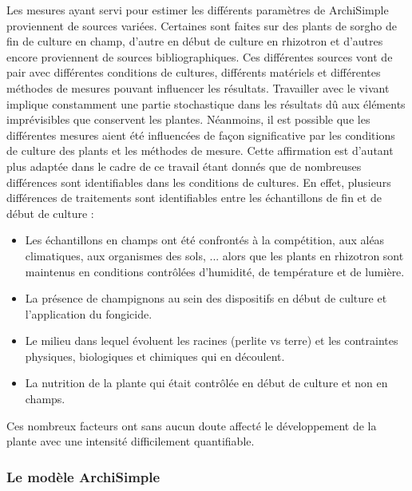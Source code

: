 Les mesures ayant servi pour estimer les différents paramètres de ArchiSimple proviennent de sources variées.
Certaines sont faites sur des plants de sorgho de fin de culture en champ, d'autre en début de culture en rhizotron et d'autres encore proviennent de sources bibliographiques.
Ces différentes sources vont de pair avec différentes conditions de cultures, différents matériels et différentes méthodes de mesures pouvant influencer les résultats. 
Travailler avec le vivant implique constamment une partie stochastique dans les résultats dû aux éléments imprévisibles que conservent les plantes.
Néanmoins, il est possible que les différentes mesures aient été influencées de façon significative par les conditions de culture des plants et les méthodes de mesure.
Cette affirmation est d'autant plus adaptée dans le cadre de ce travail étant donnés que de nombreuses différences sont identifiables dans les conditions de cultures.
En effet, plusieurs différences de traitements sont identifiables entre les échantillons de fin et de début de culture :
\begin{itemize}
    \item Les échantillons en champs ont été confrontés à la compétition, aux aléas climatiques, aux organismes des sols, ... alors que les plants en rhizotron sont maintenus en conditions contrôlées d'humidité, de température et de lumière.
    \item La présence de champignons au sein des dispositifs en début de culture et l'application du fongicide.
    \item Le milieu dans lequel évoluent les racines (perlite vs terre) et les contraintes physiques, biologiques et chimiques qui en découlent.
    \item La nutrition de la plante qui était contrôlée en début de culture et non en champs.
\end{itemize}
Ces nombreux facteurs ont sans aucun doute affecté le développement de la plante avec une intensité difficilement quantifiable.

\subsubsection{Le modèle ArchiSimple}

